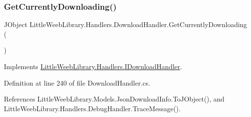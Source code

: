 \mbox{\label{class_little_weeb_library_1_1_handlers_1_1_download_handler_a3d913e57fb5f46a736c02858364609f9}} 
\subsubsection{\texorpdfstring{Get\+Currently\+Downloading()}{GetCurrentlyDownloading()}}
{\footnotesize\ttfamily J\+Object Little\+Weeb\+Library.\+Handlers.\+Download\+Handler.\+Get\+Currently\+Downloading (\begin{DoxyParamCaption}{ }\end{DoxyParamCaption})}



Implements \mbox{\hyperlink{interface_little_weeb_library_1_1_handlers_1_1_i_download_handler_aa0c6f62ad21ef6fb638314101f4357ec}{Little\+Weeb\+Library.\+Handlers.\+I\+Download\+Handler}}.



Definition at line 240 of file Download\+Handler.\+cs.



References Little\+Weeb\+Library.\+Models.\+Json\+Download\+Info.\+To\+J\+Object(), and Little\+Weeb\+Library.\+Handlers.\+Debug\+Handler.\+Trace\+Message().



